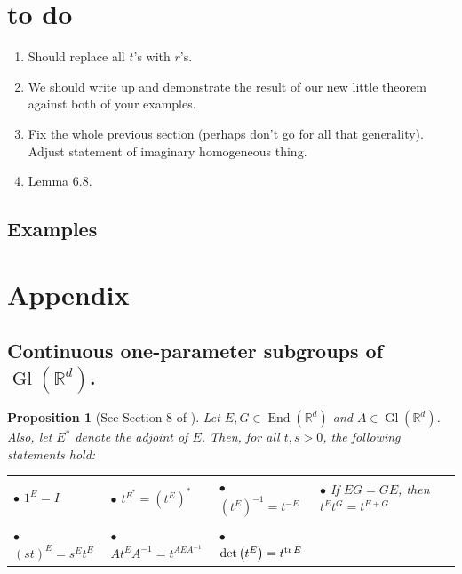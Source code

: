 \documentclass[11pt]{article}
\newtheorem{proposition}[theorem]{Proposition}
\newcommand\End{\operatorname{End}} %
\newcommand\Gl{\operatorname{Gl}} %
\renewcommand\det{\operatorname{det}}
\begin{document}
\section{to do}
\begin{enumerate}
    \item Should replace all $t$'s with $r$'s.
    \item We should write up and demonstrate the result of our new little theorem against both of your examples. 
    \item Fix the whole previous section (perhaps don't go for all that generality). Adjust statement of imaginary homogeneous thing.
    \item Lemma 6.8. 
\end{enumerate}



\subsection{Examples}




\appendix



\section{Appendix}\label{sec:Appendix}
\subsection{Continuous one-parameter subgroups of $\Gl(\mathbb{R}^d)$.}\label{subsec:OneParameterGroups}

\begin{proposition}[See Section 8 of \cite{Randles2017}]\label{prop:ContinuousGroupProperties}
Let $E,G\in\End(\mathbb{R}^d)$ and $A\in\Gl(\mathbb{R}^d)$. Also, let $E^*$ denote the adjoint of $E$. Then, for all $t,s>0$, the following statements hold:

\vspace{.3cm}
\begin{tabular}{lllll}
$\bullet$ $1^E=I$ &  $\bullet$ $t^{E^*}=(t^E)^*$ & $\bullet$ $(t^E)^{-1}=t^{-E}$ &   $\bullet$ If $EG=GE$, then $t^Et^G=t^{E+G}$\\
\vspace{.1cm}\\
$\bullet$ $(st)^E=s^Et^E$ & $\bullet$ $At^EA^{-1}=t^{AEA^{-1}}$&  $\bullet$ $\det\left(t^E\right)=t^{\tr E}$\\

\end{tabular}
\end{proposition}
\end{document}
